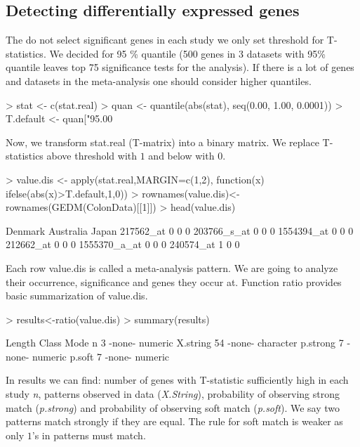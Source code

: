 \documentclass[a4paper]{report}
\begin{document}
\subsection*{Detecting differentially expressed genes}
The do not select significant genes in each study we only set threshold for T-statistics. We decided for 95 \% quantile (500 genes in 3 datasets with 95\% quantile leaves top 75 significance tests for the analysis). If there is a lot of genes and datasets in the meta-analysis one should consider higher quantiles. 
\begin{Schunk}
\begin{Sinput}
> stat <- c(stat.real)
> quan <- quantile(abs(stat), seq(0.00, 1.00, 0.0001))
> T.default <- quan["95.00%
\end{Sinput}
\end{Schunk}
Now, we transform {\ttfamily stat.real} (T-matrix) into a binary matrix. We replace T-statistics above threshold with $1$ and below with $0$.
\begin{Schunk}
\begin{Sinput}
> value.dis <- apply(stat.real,MARGIN=c(1,2), function(x) ifelse(abs(x)>T.default,1,0))
> rownames(value.dis)<-rownames(GEDM(ColonData)[[1]])
> head(value.dis)
\end{Sinput}
\begin{Soutput}
             Denmark Australia Japan
217562_at          0         0     0
203766_s_at        0         0     0
1554394_at         0         0     0
212662_at          0         0     0
1555370_a_at       0         0     0
240574_at          1         0     0
\end{Soutput}
\end{Schunk}
Each row {\ttfamily value.dis} is called a meta-analysis pattern. We are going to analyze their occurrence, significance and genes they occur at. Function {\ttfamily ratio} provides basic summarization of {\ttfamily value.dis}. 
\begin{Schunk}
\begin{Sinput}
> results<-ratio(value.dis)
> summary(results)
\end{Sinput}
\begin{Soutput}
         Length Class  Mode     
n         3     -none- numeric  
X.string 54     -none- character
p.strong  7     -none- numeric  
p.soft    7     -none- numeric  
\end{Soutput}
\end{Schunk}
In {\ttfamily results} we can find: number of genes with T-statistic sufficiently high in each study \emph{n}, patterns observed in data (\emph{X.String}), probability of observing strong match (\emph{p.strong}) and probability of observing soft match (\emph{p.soft}). We say two patterns match strongly if they are equal. The rule for soft match is weaker as only $1$'s in patterns must match. \par
\end{document}
